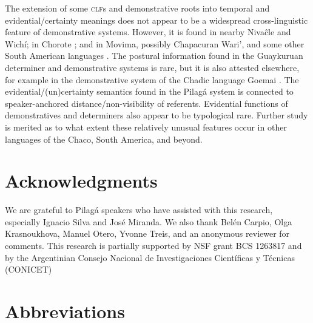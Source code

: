 \documentclass[output=paper,colorlinks,citecolor=brown]{langscibook}
\begin{document}
The extension of some \textsc{clf}s and demonstrative roots into temporal and evidential/certainty meanings does not appear to be a widespread cross-linguistic feature of demonstrative systems. However, it is found in nearby Nivaĉle and Wichí; in Chorote \citep{Carol2011}; and in Movima, possibly Chapacuran Wari’, and some other South American languages \citep{Krasnoukhova2014}. The postural information found in the Guaykuruan determiner and demonstrative systems is rare, but it is also attested elsewhere, for example in the demonstrative system of the Chadic language Goemai \citep{Hellwig2018}. The evidential/(un)certainty semantics found in the Pilagá system is connected to speaker-anchored distance/non-visibility of referents. Evidential functions of demonstratives and determiners also appear to be typological rare. Further study is merited as to what extent these relatively unusual features occur in other languages of the Chaco, South America, and beyond.

\section*{Acknowledgments}

We are grateful to Pilagá speakers who have assisted with this research, especially Ignacio Silva and José Miranda. We also thank Belén Carpio, Olga Krasnoukhova, Manuel Otero, Yvonne Treis, and an anonymous reviewer for comments. This research is partially supported by NSF grant BCS 1263817 and by the Argentinian Consejo Nacional de Investigaciones Científicas y Técnicas (CONICET)

\section*{Abbreviations}
\end{document}
